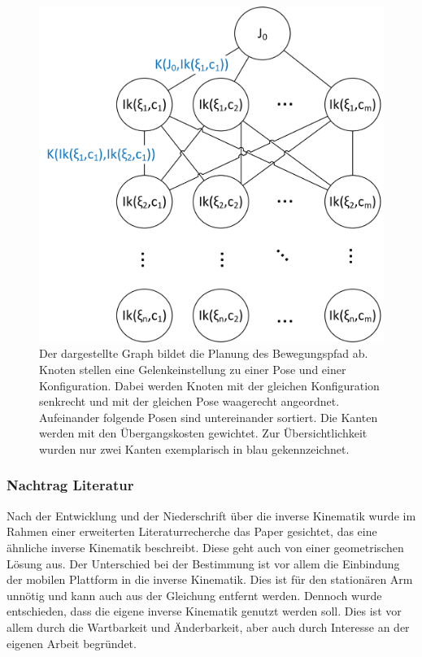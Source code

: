 \begin{figure}[h]
	\centering
	\includegraphics[scale=0.7]{fig/graphplan}
	\caption[Graph zur Pfadplanung]{Der dargestellte Graph bildet die Planung des Bewegungspfad ab. Knoten stellen eine Gelenkeinstellung zu einer Pose und einer Konfiguration. Dabei werden Knoten mit der gleichen Konfiguration senkrecht und mit der gleichen Pose waagerecht angeordnet. Aufeinander folgende Posen sind untereinander sortiert. Die Kanten werden mit den Übergangskosten gewichtet. Zur Übersichtlichkeit wurden nur zwei Kanten exemplarisch in blau gekennzeichnet.}
	\label{fig:plangraph}
\end{figure}

\subsubsection{Nachtrag Literatur}
Nach der Entwicklung und der Niederschrift über die inverse Kinematik wurde im Rahmen einer erweiterten Literaturrecherche das Paper \cite{6309496} gesichtet, das eine ähnliche inverse Kinematik beschreibt. Diese geht auch von einer geometrischen Lösung aus. Der Unterschied bei der Bestimmung ist vor allem die Einbindung der mobilen Plattform in die inverse Kinematik. Dies ist für den stationären Arm unnötig und kann auch aus der Gleichung entfernt werden. Dennoch wurde entschieden, dass die eigene inverse Kinematik genutzt werden soll. Dies ist vor allem durch die Wartbarkeit und Änderbarkeit, aber auch durch Interesse an der eigenen Arbeit begründet.
